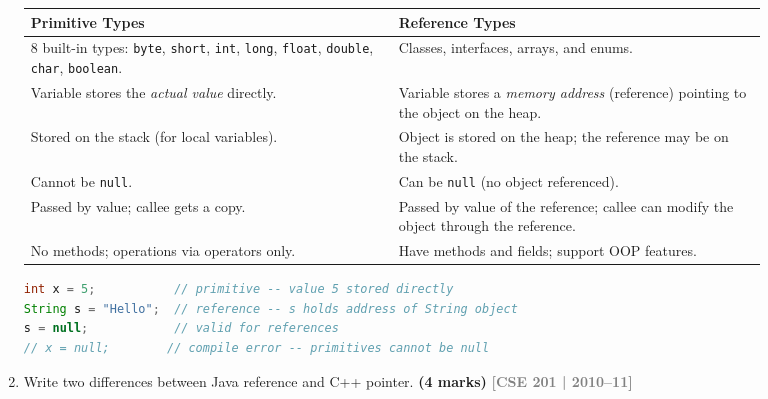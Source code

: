\documentclass[12pt,a3paper]{article}
\newcommand{\yr}[1]{\hfill\textcolor{gray}{\small\textbf{[#1]}}}
\newcommand{\mk}[1]{\textcolor{orange!70!black}{\small\textbf{(#1 marks)}}}
\begin{document}
\begin{enumerate}
\begin{tcolorbox}[enhanced,breakable,ansbox,
  colback=cB!4,colframe=cB,boxrule=0.8pt,arc=5pt,
  title={\textbf{Answer --- Primitive Types vs.\ Reference Types}},
  fonttitle=\bfseries\color{white},colbacktitle=cB]
\begin{center}
\small
\begin{tabular}{@{}p{0.44\linewidth}p{0.44\linewidth}@{}}
\toprule
\textbf{Primitive Types} & \textbf{Reference Types} \\
\midrule
8 built-in types: \texttt{byte}, \texttt{short}, \texttt{int},
\texttt{long}, \texttt{float}, \texttt{double}, \texttt{char},
\texttt{boolean}. &
Classes, interfaces, arrays, and enums. \\[4pt]
Variable stores the \emph{actual value} directly. &
Variable stores a \emph{memory address} (reference) pointing to the
object on the heap. \\[4pt]
Stored on the stack (for local variables). &
Object is stored on the heap; the reference may be on the stack. \\[4pt]
Cannot be \texttt{null}. &
Can be \texttt{null} (no object referenced). \\[4pt]
Passed by value; callee gets a copy. &
Passed by value of the reference; callee can modify the object
through the reference. \\[4pt]
No methods; operations via operators only. &
Have methods and fields; support OOP features. \\
\bottomrule
\end{tabular}
\end{center}

\begin{lstlisting}[language=Java]
int x = 5;           // primitive -- value 5 stored directly
String s = "Hello";  // reference -- s holds address of String object
s = null;            // valid for references
// x = null;        // compile error -- primitives cannot be null
\end{lstlisting}

\end{tcolorbox}

\item Write two differences between Java reference and C++ pointer. \mk{4}
\yr{CSE 201 | 2010--11}

\begin{tcolorbox}[enhanced,breakable,ansbox,
  colback=cB!4,colframe=cB,boxrule=0.8pt,arc=5pt,
  title={\textbf{Answer --- Java Reference vs.\ C++ Pointer}},
  fonttitle=\bfseries\color{white},colbacktitle=cB]


\end{tcolorbox}
\end{enumerate}
\end{document}
